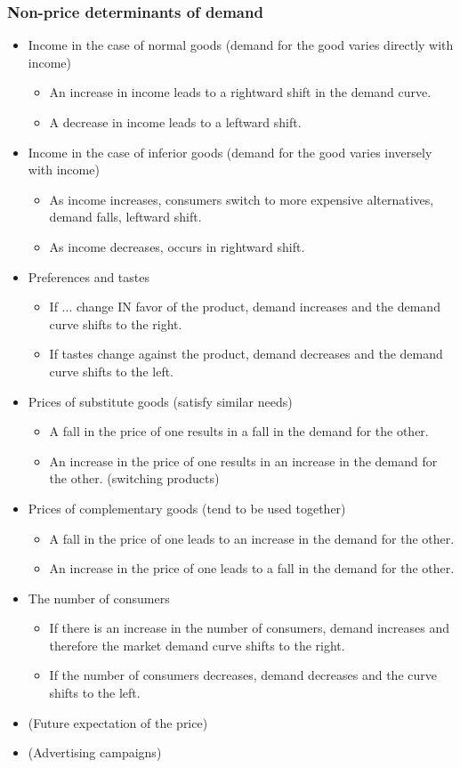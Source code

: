 \documentclass[a4paper,12pt]{article}
\begin{document}
\subsubsection*{Non-price determinants of demand}
\begin{itemize}
  \item Income in the case of normal goods (demand for the good varies directly with income)
  \begin{itemize}
    \item An increase in income leads to a rightward shift in the demand curve.
    \item A decrease in income leads to a leftward shift.
  \end{itemize}
  \item Income in the case of inferior goods (demand for the good varies inversely with income)
  \begin{itemize}
    \item As income increases, consumers switch to more expensive alternatives, demand falls, leftward shift.
    \item As income decreases, occurs in rightward shift.
  \end{itemize}
  \item Preferences and tastes
  \begin{itemize}
    \item If ... change IN favor of the product, demand increases and the demand curve shifts to the right.
    \item If tastes change against the product, demand decreases and the demand curve shifts to the left.
  \end{itemize}
  \item Prices of substitute goods (satisfy similar needs)
  \begin{itemize}
    \item A fall in the price of one results in a fall in the demand for the other.
    \item An increase in the price of one results in an increase in the demand for the other. (switching products)
  \end{itemize}
  \item Prices of complementary goods (tend to be used together)
  \begin{itemize}
    \item A fall in the price of one leads to an increase in the demand for the other.
    \item An increase in the price of one leads to a fall in the demand for the other.
  \end{itemize}
  \item The number of consumers
  \begin{itemize}
    \item If there is an increase in the number of consumers, demand increases and therefore the market demand curve shifts to the right.
    \item If the number of consumers decreases, demand decreases and the curve shifts to the left.
  \end{itemize}
  \item (Future expectation of the price)
  \item (Advertising campaigns)
\end{itemize}
\end{document}
